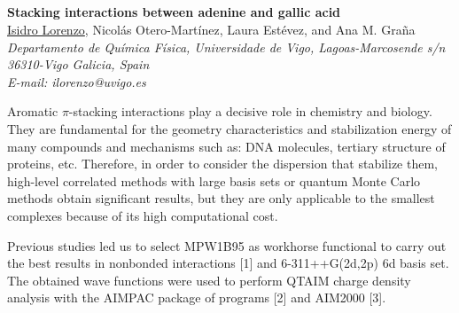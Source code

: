 \newpage
\setcounter{figure}{0}
\begin{center}
\section*{}
{\bf \Large
Stacking interactions between adenine and gallic acid
}
\\
\vspace{0.5cm}
\underline{Isidro Lorenzo}, Nicolás Otero-Martínez, Laura Estévez, and Ana M. Graña
\\
\vspace{0.5cm}
{\it
Departamento de Química Física, Universidade de Vigo, Lagoas-Marcosende s/n 36310-Vigo
Galicia, Spain
}
\\
\vspace{0.5cm}
{\it E-mail: ilorenzo@uvigo.es}
\\
\vspace{0.5cm}
\end{center}
Aromatic $\pi$-stacking interactions play a decisive role in chemistry and
biology. They are fundamental for the geometry characteristics and stabilization
energy of many compounds and mechanisms such as: DNA molecules, tertiary
structure of proteins, etc. Therefore, in order to consider the dispersion that stabilize
them, high-level correlated methods with large basis sets or quantum Monte Carlo
methods obtain significant results, but they are only applicable to the smallest
complexes because of its high computational cost.

Previous studies led us to select MPW1B95 as workhorse functional to carry
out the best results in nonbonded interactions [1] and 6-311++G(2d,2p) 6d basis set.
The obtained wave functions were used to perform QTAIM charge density analysis
with the AIMPAC package of programs [2] and AIM2000 [3].


